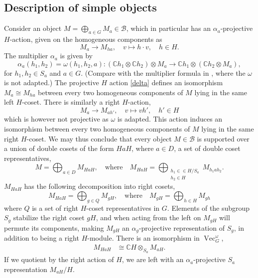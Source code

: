 \documentclass[a4paper, 10pt]{book}
\theoremstyle{definition}
\numberwithin{equation}{chapter}
\newcommand\Vect{\operatorname{Vec}}
\newcommand\CC{\mathbb C}
\newcommand\B{\mathcal B}
\begin{document}
\subsection{Description of simple objects}\label{simples} Consider an object $M=\bigoplus_{a\in G} M_a\in \B$, which in particular has an $\alpha_a$-projective $H$-action, given on the homogeneous components as \begin{equation}\label{delta}
	 M_a \rightarrow M_{ha}, \quad  v\mapsto h\cdot v, \quad h\in H.
\end{equation} The multiplier $\alpha_a$ is given by \begin{equation}\label{alpha}
	\alpha_a(h_1, h_2) = \omega(h_1, h_2, a) :(\CC{h_1}\otimes \CC{h_2}) \otimes M_{a} \rightarrow \CC{h_1} \otimes (\CC{h_2} \otimes M_{a}),
\end{equation} for $h_1, h_2 \in S_a$ and $a\in G$. (Compare with the multiplier formula in \cite{Ost:MCDDFG}, where the $\omega$ is not adapted.) The projective $H$ action \eqref{delta} defines an isomorphism $M_a\cong M_{ha}$ between every two homogeneous components of $M$ lying in the same left $H$-coset. There is similarly a right $H$-action, \begin{equation}\label{psi}
	 M_a \rightarrow M_{ah'}, \quad  v\mapsto vh', \quad h'\in H
\end{equation} which is however not projective as $\omega$ is adapted. This action induces an isomorphism between every two homogeneous components of $M$ lying in the same right $H$-coset.
We may thus conclude that every object $M \in \B$ is supported over a union of double cosets of the form $HaH$, where $a\in D$, a set of double coset representatives, \begin{equation}\label{phi}
	M= \bigoplus_{a\in D} M_{HaH}, \quad \text{where}\quad M_{HaH} =  \bigoplus_{\substack{h_1\in \in H/S_a\\h_2 \in H}} M_{h_1ah_2}.
\end{equation} $M_{HaH}$ has the following decomposition into right cosets,
\begin{equation*}
	M_{HaH}= \bigoplus_{g\in Q } M_{gH}, \quad\text{where}\quad M_{gH} = \bigoplus_{h\in H} M_{gh}
\end{equation*} where $Q$ is a set of right $H$-coset representatives in $G$. Elements of the subgroup $S_g$ stabilize the right coset $gH$, and when acting from the left on $M_{gH}$ will permute its components, making $M_{gH}$ an $\alpha_g$-projective representation of $S_g$, in addition to being a right $H$-module. 
There is an isomorphism in $\Vect^\omega_G$, \begin{align}\label{induced}
 M_{HaH} &\cong  \mathbb{C}H  \otimes_{S_a} M_{aH}.
\end{align} 
If we quotient by the right action of $H$, we are left with an $\alpha_a$-projective $S_a$ representation $M_{aH}/H$.
\end{document}
